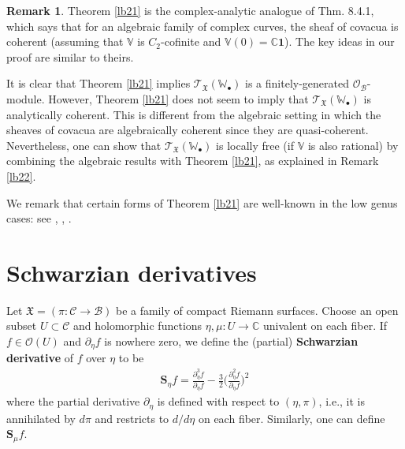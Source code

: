 \documentclass[12pt,a4paper,notitlepage]{article}
\theoremstyle{definition}
\newtheorem{rem}[df]{Remark}
\theoremstyle{plain}
\newcommand{\fk}{\mathfrak}
\newcommand{\mc}{\mathcal}
\newcommand{\id}{\mathbf{1}}
\newcommand{\scr}{\mathscr}
\newcommand{\blt}{\bullet}
\newcommand{\Vbb}{\mathbb V}
\newcommand{\Wbb}{\mathbb W}
\newcommand{\Cbb}{\mathbb C}
\newcommand{\Sbf}{\mathbf{S}}
\numberwithin{equation}{section}
\begin{document}
\begin{rem}\label{lb54}
Theorem \ref{lb21} is the complex-analytic analogue of \cite{DGT19b} Thm. 8.4.1, which says that for an algebraic family of complex curves, the sheaf of covacua is coherent (assuming that $\Vbb$ is $C_2$-cofinite and $\Vbb(0)=\Cbb\id$). The key ideas in our proof are similar to theirs.

It is clear that Theorem \ref{lb21} implies $\scr T_{\fk X}(\Wbb_\blt)$ is a finitely-generated $\scr O_{\mc B}$-module. However,  Theorem \ref{lb21} does not seem to imply that $\scr T_{\fk X}(\Wbb_\blt)$ is analytically coherent. This is different from the algebraic setting in  which the sheaves of covacua are algebraically coherent since they are quasi-coherent. Nevertheless, one can show that $\scr T_{\fk X}(\Wbb_\blt)$ is locally free (if $\Vbb$ is also rational)  by combining  the algebraic results with Theorem \ref{lb21}, as explained in Remark \ref{lb22}. 




We remark that certain forms of Theorem \ref{lb21} are well-known in the  low genus cases: see \cite[Lemma 4.4.1]{Zhu96}, \cite[Cor. 1.2]{Hua05a}, \cite[Cor. 3.4]{Hua05b}. 
\end{rem}







\section{Schwarzian derivatives}

Let $\fk X=(\pi:\mc C\rightarrow\mc B)$ be a family of compact Riemann surfaces.  Choose an open subset $U\subset \mc C$ and holomorphic functions $\eta,\mu:U\rightarrow\Cbb$ univalent on each fiber. If $f\in\scr O(U)$ and $\partial_\eta f$ is nowhere zero, we define the (partial) \textbf{Schwarzian derivative} of $f$ over $\eta$ to be \index{S@$\Sbf_\eta f,\Sbf_\eta\fk P$}
\begin{align}
\Sbf_\eta f=\frac{\partial_\eta^3f}{\partial_\eta f}-\frac 32 \Big(\frac{\partial_\eta^2f}{\partial_\eta f} \Big)^2
\end{align}
where the partial derivative $\partial_\eta$ is defined with respect to $(\eta,\pi)$, i.e., it is annihilated by $d\pi$ and restricts to $d/d\eta$ on each fiber. Similarly, one can define $\Sbf_\mu f$. 
\end{document}
